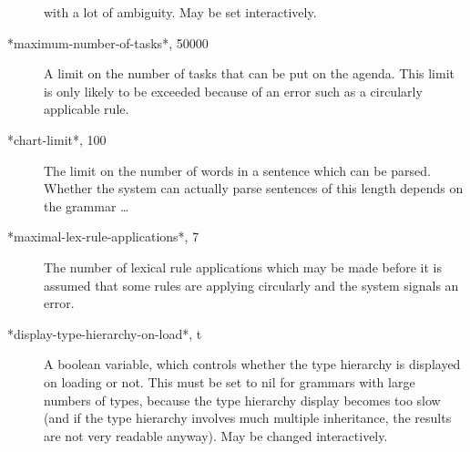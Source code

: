 \documentclass[12pt]{report}
\begin{document}
\begin{description}
with a lot of ambiguity.  May be set interactively.
\item[*maximum-number-of-tasks*, 50000]
A limit on the number of tasks that can be put on the agenda.  This 
limit is only
likely to be exceeded because of an error such as a circularly
applicable rule.
\item[*chart-limit*, 100] The limit on the number of words in a sentence
which can be parsed.  Whether the system can actually parse sentences of
this length depends on the grammar \ldots
\item[*maximal-lex-rule-applications*, 7] 
The number of lexical rule applications which may be made
before it is assumed that some rules are applying circularly and the system
signals an error.
\item[*display-type-hierarchy-on-load*, t] A boolean variable, which
controls whether the type hierarchy is displayed on loading or not.
This must be set to nil for grammars with large numbers
of types, because the type hierarchy display becomes too slow (and if the
type hierarchy involves much multiple inheritance, the results are not
very readable anyway).  May be changed interactively.
\end{description}
\end{document}
